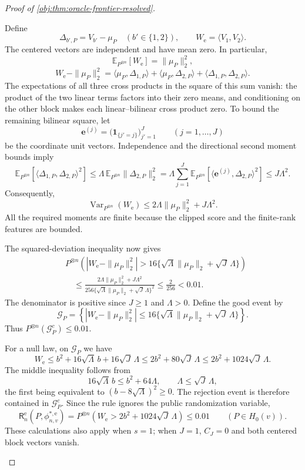 \begin{proof}[Proof of \cref{obj:thm:oracle-frontier-resolved}]
\begin{enumerate}
Define
\[
\Delta_{b',P}=V_{b'}-\mu_P\quad(b'\in\{1,2\}),
\qquad
W_{\mathrm e}=\langle V_1,V_2\rangle.
\]
The centered vectors are independent and have mean zero. In particular,
\[
\mathbb E_{P^{\otimes n}}[W_{\mathrm e}]=\|\mu_P\|_2^2,
\]
\[
W_{\mathrm e}-\|\mu_P\|_2^2
=
\langle\mu_P,\Delta_{1,P}\rangle
+\langle\mu_P,\Delta_{2,P}\rangle
+\langle\Delta_{1,P},\Delta_{2,P}\rangle.
\]
The expectations of all three cross products in the square of this sum vanish: the product of the two linear terms factors into their zero means, and conditioning on the other block makes each linear--bilinear cross product zero. To bound the remaining bilinear square, let
\[
\mathbf e^{(j)}
=\bigl(\mathbf1_{\{j'=j\}}\bigr)_{j'=1}^{J}
\qquad(j=1,\ldots,J)
\]
be the coordinate unit vectors. Independence and the directional second moment bounds imply
\[
\mathbb E_{P^{\otimes n}}
\!\left[\langle\Delta_{1,P},\Delta_{2,P}\rangle^2\right]
\le\Lambda\,\mathbb E_{P^{\otimes n}}\|\Delta_{2,P}\|_2^2
=\Lambda\sum_{j=1}^{J}
\mathbb E_{P^{\otimes n}}
\!\left[\langle\mathbf e^{(j)},\Delta_{2,P}\rangle^2\right]
\le J\Lambda^2.
\]
Consequently,
\[
\operatorname{Var}_{P^{\otimes n}}(W_{\mathrm e})
\le2\Lambda\|\mu_P\|_2^2+J\Lambda^2.
\]
All the required moments are finite because the clipped score and the finite-rank features are bounded.

The squared-deviation inequality now gives
\[
\begin{aligned}
&P^{\otimes n}\!\left(
|W_{\mathrm e}-\|\mu_P\|_2^2|
>16\{\sqrt\Lambda\|\mu_P\|_2+\sqrt J\,\Lambda\}
\right)\\
&\quad\le
\frac{2\Lambda\|\mu_P\|_2^2+J\Lambda^2}
{256\{\sqrt\Lambda\|\mu_P\|_2+\sqrt J\,\Lambda\}^2}
\le\frac{2}{256}<0.01.
\end{aligned}
\]
The denominator is positive since \(J\ge1\) and \(\Lambda>0\).
Define the good event by
\[
\mathcal G_P=
\left\{
|W_{\mathrm e}-\|\mu_P\|_2^2|
\le16\{\sqrt\Lambda\|\mu_P\|_2+\sqrt J\,\Lambda\}
\right\}.
\]
Thus \(P^{\otimes n}(\mathcal G_P^c)\le0.01\).

For a null law, on \(\mathcal G_P\) we have
\[
W_{\mathrm e}
\le b^2+16\sqrt\Lambda\,b+16\sqrt J\,\Lambda
\le2b^2+80\sqrt J\,\Lambda
\le2b^2+1024\sqrt J\,\Lambda.
\]
The middle inequality follows from
\[
16\sqrt\Lambda\,b\le b^2+64\Lambda,
\qquad
\Lambda\le\sqrt J\,\Lambda,
\]
the first being equivalent to \((b-8\sqrt\Lambda)^2\ge0\).
The rejection event is therefore contained in \(\mathcal G_P^c\). Since the rule ignores the public randomization variable,
\[
\mathsf R_n^{\mathrm e}(P,\phi^{*,\mathrm e}_{n,v})
=
P^{\otimes n}\!\left(
W_{\mathrm e}>2b^2+1024\sqrt J\,\Lambda
\right)
\le0.01
\qquad(P\in H_0(v)).
\]
These calculations also apply when \(s=1\); when \(J=1\), \(C_J=0\) and both centered block vectors vanish.


\end{enumerate}
\end{proof}
